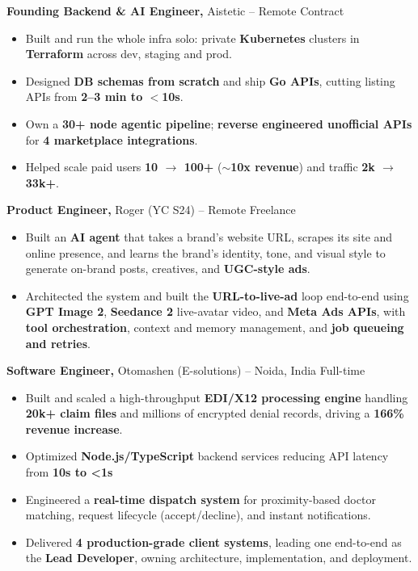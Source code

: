 \documentclass[10pt,a4paper]{article}
\newcommand{\experience}[4]{%
    \textbf{#1,} #2 -- #3 \hfill #4
}
\begin{document}
\experience{Founding Backend \& AI Engineer}{Aistetic}{Remote}{Contract}
\begin{itemize}[leftmargin=20pt]
\item Built and run the whole infra solo: private \textbf{Kubernetes} clusters in \textbf{Terraform} across dev, staging and prod.
\item Designed \textbf{DB schemas from scratch} and ship \textbf{Go APIs}, cutting listing APIs from \textbf{2--3 min to $<$10s}.
\item Own a \textbf{30+ node agentic pipeline}; \textbf{reverse engineered unofficial APIs} for \textbf{4 marketplace integrations}.
\item Helped scale paid users \textbf{10 $\rightarrow$ 100+} (\textbf{$\sim$10x revenue}) and traffic \textbf{2k $\rightarrow$ 33k+}.
\end{itemize}

\experience{Product Engineer}{Roger (YC S24)}{Remote}{Freelance}
\begin{itemize}[leftmargin=20pt]
\item Built an \textbf{AI agent} that takes a brand's website URL, scrapes its site and online presence, and learns the brand's identity, tone, and visual style to generate on-brand posts, creatives, and \textbf{UGC-style ads}.
\item Architected the system and built the \textbf{URL-to-live-ad} loop end-to-end using \textbf{GPT Image 2}, \textbf{Seedance 2} live-avatar video, and \textbf{Meta Ads APIs}, with \textbf{tool orchestration}, context and memory management, and \textbf{job queueing and retries}.
\end{itemize}

\experience{Software Engineer}{Otomashen (E-solutions)}{Noida, India}{Full-time}
\begin{itemize}[leftmargin=20pt]

\item Built and scaled a high-throughput \textbf{EDI/X12 processing engine} handling \textbf{20k+ claim files} and millions of encrypted denial records, driving a \textbf{166\% revenue increase}.

\item Optimized \textbf{Node.js/TypeScript} backend services reducing API latency from \textbf{10s to <1s}

\item Engineered a \textbf{real-time dispatch system} for proximity-based doctor matching, request lifecycle (accept/decline), and instant notifications.

\item Delivered \textbf{4 production-grade client systems}, leading one end-to-end as the \textbf{Lead Developer}, owning architecture, implementation, and deployment.

\end{itemize}
\end{document}
